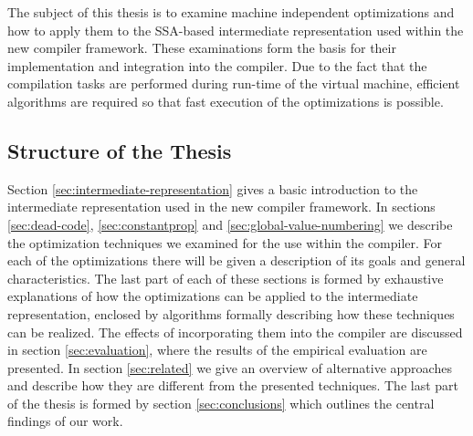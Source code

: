The subject of this thesis is to examine machine independent optimizations and how to apply them to the SSA-based intermediate representation used within the new compiler framework. These examinations form the basis for their implementation and integration into the compiler.
Due to the fact that the compilation tasks are performed during run-time of the virtual machine, efficient algorithms are required so that fast execution of the optimizations is possible.

\subsection{Structure of the Thesis}
\label{sec:paper-structure}

Section \ref{sec:intermediate-representation} gives a basic introduction to the intermediate representation used in the new compiler framework. In sections \ref{sec:dead-code}, \ref{sec:constantprop} and \ref{sec:global-value-numbering} we describe the optimization techniques we examined for the use within the compiler. For each of the optimizations there will be given a description of its goals and general characteristics. The last part of each of these sections is formed by exhaustive explanations of how the optimizations can be applied to the intermediate representation, enclosed by algorithms formally describing how these techniques can be realized. The effects of incorporating them into the compiler are discussed in section \ref{sec:evaluation}, where the results of the empirical evaluation are presented.
In section \ref{sec:related} we give an overview of alternative approaches and describe how they are different from the presented techniques.
The last part of the thesis is formed by section \ref{sec:conclusions} which outlines the central findings of our work.
